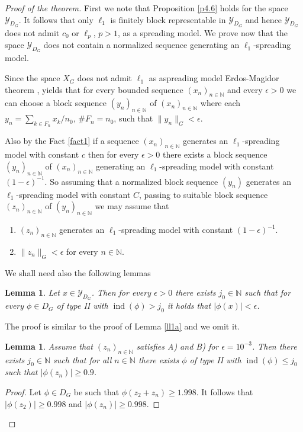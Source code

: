 \documentclass[a4paper]{amsart}
\theoremstyle{plain}
\newtheorem{lemma}[theorem]{Lemma}
\newcommand{\N}{\mathbb{N}}
\newcommand{\mc}{\mathcal}
\newcommand{\e}{\epsilon}
\newcommand{\norm}[1][\cdot]{\lVert #1\rVert}
\newcommand{\xn}[1][x]{(#1_{n})_{n\in\N}}
\DeclareMathOperator{\inde}{ind}
\begin{document}
\begin{proof}[Proof of the theorem]
First we note that  Proposition \ref{p4.6}  holds for the space $\mc{Y}_{D_G}$. It follows
that  only  $\ell_{1}$ is finitely block representable  in  $\mc{Y}_{D_G}$ and hence
$\mc{Y}_{D_G}$ does not admit $c_0$ or $\ell_{p}$, $p>1$, as a spreading model. We prove
now that the space $\mc{Y}_{D_G}$ does not contain a normalized sequence generating an
$\ell_{1}$-spreading model.


Since the space  $X_{G}$ does not admit  $\ell_{1}$ as aspreading  model Erdos-Magidor
theorem \cite{EM},  yields  that for every bounded sequence $\xn$ and
every $\e>0$ we can choose a block sequence $\xn[y]$  of $\xn$
where each  $y_{n}=\sum_{k\in F_{n}}x_{k}/n_0$,  $\#F_{n}=n_0$,
such that $\norm[y_n]_{G}<\e$.

Also by the Fact \ref{fact1}  if a sequence $\xn$ generates an $\ell_{1}$-spreading model with constant $c$ then for every $\e>0$ there
exists a block sequence  $\xn[y]$ of $\xn$ generating an $\ell_{1}$-spreading model with constant $(1-\e)^{-1}$.
So assuming   that a normalized block sequence $(y_n)$ generates an
$\ell_{1}$-spreading model with constant $C$,  passing to suitable  block sequence $\xn[z]$ of $\xn[y]$ we may assume that
\begin{enumerate}
\item[A)]  $\xn[z]$ generates an $\ell_{1}$-spreading model with constant $(1-\e)^{-1}$.
\item[B)] $\norm[z_n]_{G}<\e$ for every $n\in\N$.
\end{enumerate}
We shall need  also the following lemmas
\begin{lemma}\label{le7.1}
 Let $x\in \mathcal{Y}_{D_G}$.
Then for every $\e>0$ there exists $j_0\in\N$ such that for every $\phi\in D_{G}$ of
type II with $\inde(\phi)> j_0$ it holds that $\vert \phi(x)\vert<\e$.
\end{lemma}
The proof is similar to the proof of Lemma \ref{ll1a} and we omit it.
\begin{lemma}\label{le7.2} Assume that $\xn[z]$  satisfies A) and B) for $\e=10^{-3}$.
Then there exists $j_0\in\N$ such that for all  $n\in\N$ there exists $\phi$ of type II
with  $\inde(\phi)\leq j_0$ such that $\vert \phi(z_{n})\vert \geq 0.9$.
\end{lemma}
\begin{proof}
Let $\phi\in D_{G}$ be such that $\phi(z_{2}+z_{n})\geq 1.998.$
It follows that  $\vert \phi (z_{2})\vert \geq 0.998$ and $\vert\phi(z_{n})\vert\geq 0.998$.


\end{proof}
\end{proof}
\end{document}
